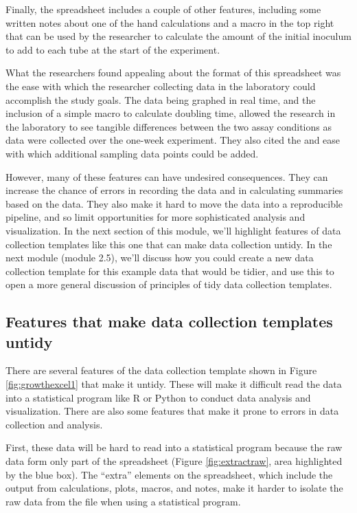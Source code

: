 \documentclass[]{tufte-book}
\begin{document}
Finally, the spreadsheet includes a couple of other features, including some
written notes about one of the hand calculations and a macro in the top right
that can be used by the researcher to calculate the amount of the initial
inoculum to add to each tube at the start of the experiment.

What the researchers found appealing about the format of this spreadsheet was
the ease with which the researcher collecting data in the laboratory could
accomplish the study goals. The data being graphed in real time, and the
inclusion of a simple macro to calculate doubling time, allowed the research in
the laboratory to see tangible differences between the two assay conditions as
data were collected over the one-week experiment. They also cited the and ease
with which additional sampling data points could be added.

However, many of these features can have undesired consequences. They can increase
the chance of errors in recording the data and in calculating summaries based on the
data. They also make it hard to move the data into a reproducible pipeline, and
so limit opportunities for more sophisticated analysis and visualization. In the
next section of this module, we'll highlight features of data collection templates
like this one that can make data collection untidy. In the next module (module 2.5),
we'll discuss how you could create a new data collection template for this example
data that would be tidier, and use this to open a more general discussion of
principles of tidy data collection templates.

\subsection{Features that make data collection templates untidy}\label{features-that-make-data-collection-templates-untidy}

There are several features of the data collection template shown in Figure
\ref{fig:growthexcel1} that make it untidy. These will make it difficult read
the data into a statistical program like R or Python to conduct data analysis
and visualization. There are also some features that make it prone to errors in
data collection and analysis.

First, these data will be hard to read into a statistical program because the
raw data form only part of the spreadsheet (Figure \ref{fig:extractraw}, area
highlighted by the blue box). The ``extra'' elements on the spreadsheet, which
include the output from calculations, plots, macros, and notes, make it harder
to isolate the raw data from the file when using a statistical program.
\end{document}
